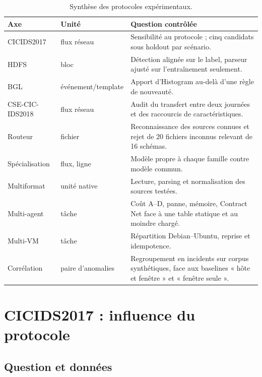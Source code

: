 \begin{table}[H]
\centering
\caption{Synthèse des protocoles expérimentaux.}
\label{tab:protocoles-experimentaux}
\small
\begin{tabularx}{\textwidth}{p{} p{} X}
\toprule
\textbf{Axe} & \textbf{Unité} & \textbf{Question contrôlée} \\
\midrule
CICIDS2017 & flux réseau & Sensibilité au protocole ; cinq candidats sous holdout par scénario. \\
HDFS & bloc & Détection alignée sur le label, parseur ajusté sur l'entraînement seulement. \\
BGL & événement/template & Apport d’Histogram au-delà d’une règle de nouveauté. \\
CSE-CIC-IDS2018 & flux réseau & Audit du transfert entre deux journées et des raccourcis de caractéristiques. \\
Routeur & fichier & Reconnaissance des sources connues et rejet de 20 fichiers inconnus relevant de 16 schémas. \\
Spécialisation & flux, ligne & Modèle propre à chaque famille contre modèle commun. \\
Multiformat & unité native & Lecture, parsing et normalisation des sources testées. \\
Multi-agent & tâche & Coût A--D, panne, mémoire, Contract Net face à une table statique et au moindre chargé. \\
Multi-VM & tâche & Répartition Debian--Ubuntu, reprise et idempotence. \\
Corrélation & paire d'anomalies & Regroupement en incidents sur corpus synthétiques, face aux baselines « hôte et fenêtre » et « fenêtre seule ». \\
\bottomrule
\end{tabularx}
\end{table}

\section{CICIDS2017 : influence du protocole}
\label{sec:cicids-resultats}

\subsection{Question et données}

